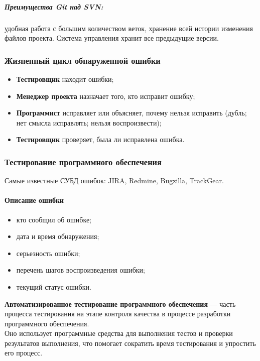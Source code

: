 \subparagraph{Преимущества Git над SVN:} удобная работа с большим количеством веток, хранение всей истории изменения файлов проекта. Система управления хранит все предыдущие версии.

\subsubsection{Жизненный цикл обнаруженной ошибки}\label{subsubsec:bug-lifecycle}
\begin{itemize}
    \item \textbf{Тестировщик} находит ошибки;
    \item \textbf{Менеджер проекта} назначает того, кто исправит ошибку;
    \item \textbf{Программист} исправляет или объясняет, почему нельзя исправить (дубль; нет смысла исправлять; нельзя воспроизвести);
    \item \textbf{Тестировщик} проверяет, была ли исправлена ошибка.
\end{itemize}

\subsubsection{Тестирование программного обеспечения}\label{subsubsec:software-testing}
Самые известные СУБД ошибок: JIRA, Redmine, Bugzilla, TrackGear.

\paragraph{Описание ошибки}\label{par:bug-description}
\begin{itemize}
    \item кто сообщил об ошибке;
    \item дата и время обнаружения;
    \item серьезность ошибки;
    \item перечень шагов воспроизведения ошибки;
    \item текущий статус ошибки.
\end{itemize}

\textbf{Автоматизированное тестирование программного обеспечения} --- часть процесса тестирования на этапе контроля качества в процессе разработки программного обеспечения.\\
Оно использует программные средства для выполнения тестов и проверки результатов выполнения, что помогает сократить время тестирования и упростить его процесс.

